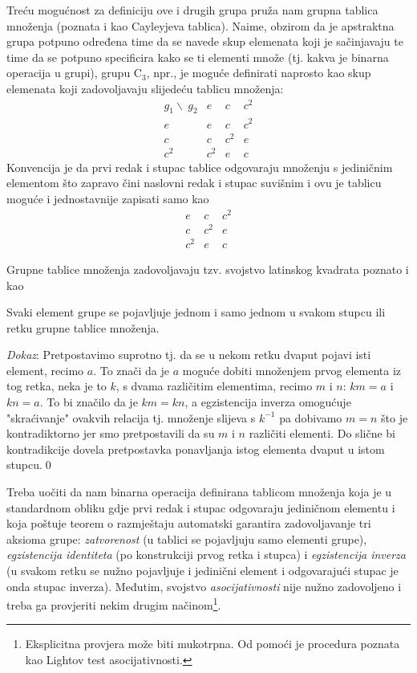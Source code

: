 Treću mogućnost za definiciju ove i drugih grupa pruža nam grupna tablica množenja
(poznata i kao Cayleyjeva tablica).
Naime, obzirom da je apstraktna grupa potpuno određena time da se navede
skup elemenata koji je sačinjavaju te time da se potpuno specificira kako
se ti elementi množe (tj. kakva je binarna operacija u grupi), grupu C$_3$, npr.,
je moguće definirati naprosto kao skup elemenata koji zadovoljavaju slijedeću tablicu
množenja:
\begin{equation}
\begin{array}{c|ccc}
g_1\backslash\ g_2 & e & c & c^2 \\ \hline
   e    & e & c & c^2 \\
   c    & c & c^2 & e \\
   c^2    & c^2 & e & c
\end{array}
\label{eq:cntab}
\end{equation}
Konvencija je da prvi redak i stupac tablice odgovaraju množenju
s jediničnim elementom što zapravo čini naslovni redak i stupac
suvišnim i ovu je tablicu moguće i jednostavnije zapisati samo kao
\begin{equation}
\begin{array}{|ccc}
 \hline
 e & c & c^2 \\
 c & c^2 & e \\
 c^2 & e & c
\end{array}
\label{eq:cntabsimple}
\end{equation}

Grupne tablice množenja zadovoljavaju tzv. svojstvo latinskog
kvadrata poznato i kao
\begin{teorem}
Svaki element grupe se pojavljuje jednom i samo jednom u svakom stupcu
ili retku grupne tablice množenja.
\end{teorem}

\emph{Dokaz}: Pretpostavimo suprotno tj. da se u nekom retku
dvaput pojavi isti element, recimo $a$. To znači da je $a$ moguće
dobiti množenjem prvog elementa iz tog retka, neka je to $k$, s
dvama različitim elementima, recimo $m$ i $n$: $km=a$ i $kn=a$. To bi značilo
da je $km=kn$, a egzistencija inverza omogućuje "skraćivanje"
ovakvih relacija tj. množenje slijeva s $k^{-1}$ pa
dobivamo $m=n$ što je kontradiktorno jer smo pretpostavili da su
$m$ i $n$ različiti elementi. Do slične bi kontradikcije dovela
pretpostavka  ponavljanja istog elementa dvaput u istom stupcu.\qed

Treba uočiti da nam binarna operacija definirana tablicom množenja
koja je u standardnom obliku gdje prvi redak i stupac odgovaraju
jediničnom elementu i koja poštuje teorem o razmještaju automatski 
garantira zadovoljavanje tri aksioma grupe: 
\emph{zatvorenost} (u tablici se pojavljuju samo elementi grupe), 
\emph{egzistencija identiteta} (po konstrukciji prvog retka i stupca) i
\emph{egzistencija inverza} (u svakom retku se nužno pojavljuje i 
jedinični element i odgovarajući stupac je onda stupac inverza).
Međutim, svojstvo \emph{asocijativnosti} nije nužno zadovoljeno
i treba ga provjeriti nekim drugim načinom\footnote{Eksplicitna provjera
može biti mukotrpna. Od pomoći je procedura poznata kao Lightov
test asocijativnosti.}.


